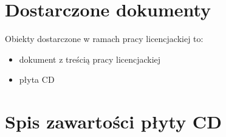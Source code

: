 \documentclass{pracamgr}
\begin{document}
\chapter{Dostarczone dokumenty}

Obiekty dostarczone w ramach pracy licencjackiej to:
\begin{itemize}
\item dokument z treścią pracy licencjackiej
\item płyta CD
\end{itemize}

\chapter{Spis zawartości płyty CD}




\begin{thebibliography}{99}


\end{thebibliography}
\end{document}
